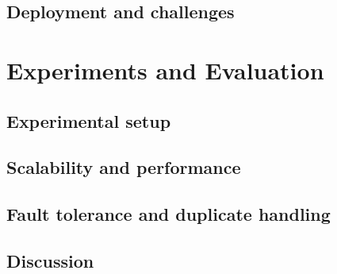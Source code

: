 \subsection{Deployment and challenges}









\newpage
\section{Experiments and Evaluation}


\subsection{Experimental setup}




\subsection{Scalability and performance}




\subsection{Fault tolerance and duplicate handling}




\subsection{Discussion}




